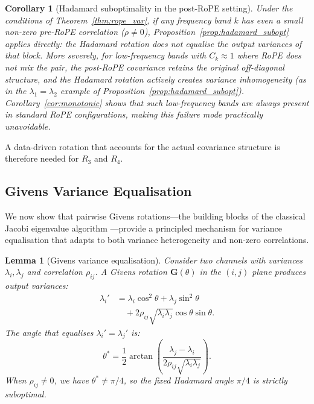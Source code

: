 \documentclass[11pt,a4paper]{article}
\newtheorem{lemma}[theorem]{Lemma}
\newtheorem{corollary}[theorem]{Corollary}
\newcommand{\bG}{\mathbf{G}}
\begin{document}
\begin{corollary}[Hadamard suboptimality in the post-RoPE setting]
\label{cor:hadamard_rope}
Under the conditions of Theorem~\ref{thm:rope_var}, if any frequency band $k$ has even a small non-zero pre-RoPE correlation ($\rho \neq 0$), Proposition~\ref{prop:hadamard_subopt} applies directly: the Hadamard rotation does not equalise the output variances of that block.
More severely, for low-frequency bands with $C_k \approx 1$ where RoPE does not mix the pair, the post-RoPE covariance retains the original off-diagonal structure, and the Hadamard rotation actively \emph{creates} variance inhomogeneity (as in the $\lambda_1 = \lambda_2$ example of Proposition~\ref{prop:hadamard_subopt}).
Corollary~\ref{cor:monotonic} shows that such low-frequency bands are always present in standard RoPE configurations, making this failure mode practically unavoidable.
\end{corollary}

A data-driven rotation that accounts for the actual covariance structure is therefore needed for $R_3$ and $R_4$.

\subsection{Givens Variance Equalisation}

We now show that pairwise Givens rotations---the building blocks of the classical Jacobi eigenvalue algorithm \cite{golub2013matrix}---provide a principled mechanism for variance equalisation that adapts to both variance heterogeneity and non-zero correlations.

\begin{lemma}[Givens variance equalisation]
\label{lem:givens_eq}
Consider two channels with variances $\lambda_i, \lambda_j$ and correlation $\rho_{ij}$.
A Givens rotation $\bG(\theta)$ in the $(i,j)$ plane produces output variances:
\begin{equation}
\label{eq:givens_var}
\begin{split}
\lambda_i' &= \lambda_i \cos^2\theta + \lambda_j \sin^2\theta \\
&\quad + 2\rho_{ij}\sqrt{\lambda_i\lambda_j}\cos\theta\sin\theta.
\end{split}
\end{equation}
The angle that equalises $\lambda_i' = \lambda_j'$ is:
\begin{equation}
\label{eq:givens_optimal}
\theta^* = \frac{1}{2}\arctan\!\left(\frac{\lambda_j - \lambda_i}{2\rho_{ij}\sqrt{\lambda_i\lambda_j}}\right).
\end{equation}
When $\rho_{ij} \neq 0$, we have $\theta^* \neq \pi/4$, so the fixed Hadamard angle $\pi/4$ is strictly suboptimal.
\end{lemma}
\end{document}
